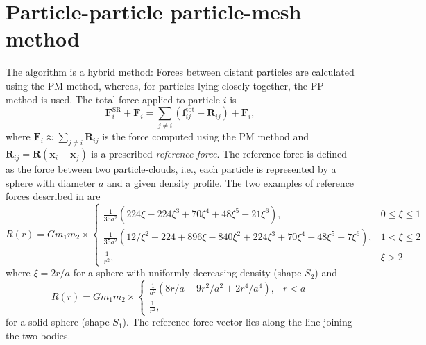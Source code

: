 \chapter{Particle-particle particle-mesh method} %
The \PThreeM{} algorithm is a hybrid method:
Forces between distant particles are calculated using the PM method, whereas, for particles lying closely together, the PP method is used.
The total force applied to particle $i$ is
\begin{equation}\label{eq:p3m}
    \mathbf{F}_i^\text{SR} + \mathbf{F}_i = \sum_{j \neq i}(\mathbf{f}_{ij}^\text{tot} - \mathbf{R}_{ij}) + \mathbf{F}_i,
\end{equation}
where $\mathbf{F}_i \approx \sum_{j\neq i} \mathbf{R}_{ij}$ is the force computed using the PM method and $\mathbf{R}_{ij} = \mathbf{R}(\mathbf{x}_i - \mathbf{x}_j)$ is a prescribed \textit{reference force}.
The reference force is defined as the force between two particle-clouds, i.e., each particle is represented by a sphere with diameter $a$ and a given density profile.
The two examples of reference forces described in \cite{Hockney1988} are
\begin{equation*}
    R(r) =
    G m_1 m_2 \times\begin{cases}
        \frac{1}{35 a^2} (224 \xi - 224 \xi^3 + 70 \xi^4 + 48 \xi^5 - 21 \xi^6),                               & 0 \leq \xi \leq 1 \\
        \frac{1}{35 a^2} (12 / \xi^2 - 224 + 896 \xi - 840 \xi^2 + 224 \xi^3 + 70 \xi^4 - 48 \xi^5 + 7 \xi^6), & 1 < \xi \leq 2    \\
        \frac{1}{r^2},                                                                                         & \xi > 2
    \end{cases}
\end{equation*}
where $\xi = 2r/a$ for a sphere with uniformly decreasing density (shape $S_2$) and
\begin{equation}\label{eq:s1-reference-force}
    R(r) =
    G m_1 m_2 \times\begin{cases}
        \frac{1}{a^2} (8 r / a - 9 r^2 / a^2 + 2 r^4 / a^4), & r < a \\
        \frac{1}{r^2},
    \end{cases}
\end{equation}
for a solid sphere (shape $S_1$).
The reference force vector lies along the line joining the two bodies.






